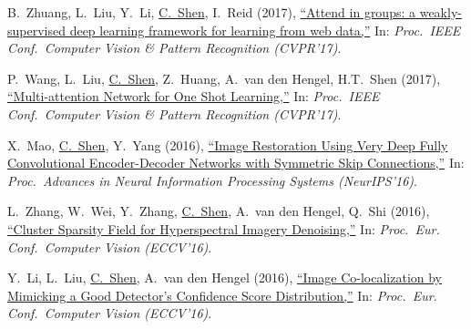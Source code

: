 \documentclass[9pt, a4paper]{article}
\newcommand{\years}[1]{\marginnote{\scriptsize #1}}
\def\highlight{\uline}
\begin{document}
\medskip

\years{2017} B.~Zhuang, L.~Liu, Y.~Li, \highlight{C.~Shen}, I.~Reid (2017),
\href{http://www.google.com/search?lr=&ie=UTF-8&oe=UTF-8&q=Attend+in+groups%3A+a+weakly-supervised+deep+learning+framework+for+learning+from+web+data+Bohan+Zhuang%2C+Lingqiao+Liu%2C+Yao+Li%2C+Chunhua+Shen%2C+Ian+Reid}{``Attend in groups: a weakly-supervised deep learning framework for learning from web data,{}''}
In: \emph{Proc.\ IEEE Conf.\  Computer Vision \& Pattern Recognition (CVPR'17)}.

\medskip

\years{2017} P.~Wang, L.~Liu, \highlight{C.~Shen}, Z.~Huang, A.~van den Hengel, H.T.~Shen (2017),
\href{http://www.google.com/search?lr=&ie=UTF-8&oe=UTF-8&q=Multi-attention+Network+for+One+Shot+Learning+Peng+Wang%2C+Lingqiao+Liu%2C+Chunhua+Shen%2C+Zi+Huang%2C+Anton+van+den+Hengel%2C+Heng+Tao+Shen}{``Multi-attention Network for One Shot Learning,{}''}
In: \emph{Proc.\ IEEE Conf.\  Computer Vision \& Pattern Recognition (CVPR'17)}.

\medskip

\years{2016} X.~Mao, \highlight{C.~Shen}, Y.~Yang (2016),
\href{http://www.google.com/search?lr=&ie=UTF-8&oe=UTF-8&q=Image+Restoration+Using+Very+Deep+Fully+Convolutional+Encoder-Decoder+Networks+with+Symmetric+Skip+Connections+Xiao-Jiao+Mao%2C+Chunhua+Shen%2C+Yu-Bin+Yang}{``Image Restoration Using Very Deep Fully Convolutional Encoder-Decoder Networks with Symmetric Skip Connections,{}''}
In: \emph{Proc.\ Advances in Neural Information Processing Systems (NeurIPS'16)}.

\medskip

\years{2016} L.~Zhang, W.~Wei, Y.~Zhang, \highlight{C.~Shen}, A.~van den Hengel, Q.~Shi (2016),
\href{http://www.google.com/search?lr=&ie=UTF-8&oe=UTF-8&q=Cluster+Sparsity+Field+for+Hyperspectral+Imagery+Denoising+Lei+Zhang%2C+Wei+Wei%2C+Yanning+Zhang%2C+Chunhua+Shen%2C+Anton+van+den+Hengel%2C+Qinfeng+Shi}{``Cluster Sparsity Field for Hyperspectral Imagery Denoising,{}''}
In: \emph{Proc.\ Eur. Conf.\  Computer Vision (ECCV'16)}.

\medskip

\years{2016} Y.~Li, L.~Liu, \highlight{C.~Shen}, A.~van den Hengel (2016),
\href{http://www.google.com/search?lr=&ie=UTF-8&oe=UTF-8&q=Image+Co-localization+by+Mimicking+a+Good+Detector%27s+Confidence+Score+Distribution+Yao+Li%2C+Lingqiao+Liu%2C+Chunhua+Shen%2C+Anton+van+den+Hengel}{``Image Co-localization by Mimicking a Good Detector's Confidence Score Distribution,{}''}
In: \emph{Proc.\ Eur. Conf.\  Computer Vision (ECCV'16)}.
\end{document}
